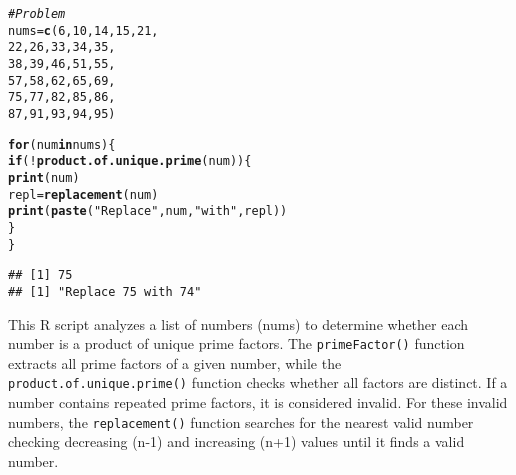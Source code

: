 \documentclass{article}\usepackage[]{graphicx}\usepackage[]{xcolor}
\makeatletter
\newcommand{\hlnum}[1]{\textcolor[rgb]{0.686,0.059,0.569}{#1}}%
\newcommand{\hlsng}[1]{\textcolor[rgb]{0.192,0.494,0.8}{#1}}%
\newcommand{\hlcom}[1]{\textcolor[rgb]{0.678,0.584,0.686}{\textit{#1}}}%
\newcommand{\hlopt}[1]{\textcolor[rgb]{0,0,0}{#1}}%
\newcommand{\hldef}[1]{\textcolor[rgb]{0.345,0.345,0.345}{#1}}%
\newcommand{\hlkwa}[1]{\textcolor[rgb]{0.161,0.373,0.58}{\textbf{#1}}}%
\newcommand{\hlkwb}[1]{\textcolor[rgb]{0.69,0.353,0.396}{#1}}%
\newcommand{\hlkwd}[1]{\textcolor[rgb]{0.737,0.353,0.396}{\textbf{#1}}}%
\newenvironment{kframe}{%
 \def\at@end@of@kframe{}%
 \ifinner\ifhmode%
  \def\at@end@of@kframe{\end{minipage}}%
  \begin{minipage}{\columnwidth}%
 \fi\fi%
 \def\FrameCommand##1{\hskip\@totalleftmargin \hskip-\fboxsep
 \colorbox{shadecolor}{##1}\hskip-\fboxsep
     \hskip-\linewidth \hskip-\@totalleftmargin \hskip\columnwidth}%
 \MakeFramed {\advance\hsize-\width
   \@totalleftmargin\z@ \linewidth\hsize
   \@setminipage}}%
 {\par\unskip\endMakeFramed%
 \at@end@of@kframe}
\newenvironment{knitrout}{}{} %
\makeatother
\begin{document}
\begin{enumerate}
\begin{knitrout}
\begin{kframe}
\begin{alltt}
\hlcom{# Problem}
\hldef{nums} \hlkwb{=} \hlkwd{c}\hldef{(}\hlnum{6}\hldef{,} \hlnum{10}\hldef{,} \hlnum{14}\hldef{,} \hlnum{15}\hldef{,} \hlnum{21}\hldef{,}
         \hlnum{22}\hldef{,} \hlnum{26}\hldef{,} \hlnum{33}\hldef{,} \hlnum{34}\hldef{,} \hlnum{35}\hldef{,}
         \hlnum{38}\hldef{,} \hlnum{39}\hldef{,} \hlnum{46}\hldef{,} \hlnum{51}\hldef{,} \hlnum{55}\hldef{,}
         \hlnum{57}\hldef{,} \hlnum{58}\hldef{,} \hlnum{62}\hldef{,} \hlnum{65}\hldef{,} \hlnum{69}\hldef{,}
         \hlnum{75}\hldef{,} \hlnum{77}\hldef{,} \hlnum{82}\hldef{,} \hlnum{85}\hldef{,} \hlnum{86}\hldef{,}
         \hlnum{87}\hldef{,} \hlnum{91}\hldef{,} \hlnum{93}\hldef{,} \hlnum{94}\hldef{,} \hlnum{95}\hldef{)}

\hlkwa{for} \hldef{(num} \hlkwa{in} \hldef{nums) \{}
  \hlkwa{if} \hldef{(}\hlopt{!}\hlkwd{product.of.unique.prime}\hldef{(num))\{}
    \hlkwd{print}\hldef{(num)}
    \hldef{repl} \hlkwb{=} \hlkwd{replacement}\hldef{(num)}
    \hlkwd{print}\hldef{(}\hlkwd{paste}\hldef{(}\hlsng{"Replace"}\hldef{, num,} \hlsng{"with"}\hldef{, repl))}
  \hldef{\}}
\hldef{\}}
\end{alltt}
\begin{verbatim}
## [1] 75
## [1] "Replace 75 with 74"
\end{verbatim}
\end{kframe}
\end{knitrout}

This R script analyzes a list of numbers (nums) to determine whether each number is a product of unique prime factors. The \texttt{primeFactor()} function extracts all prime factors of a given number, while the \texttt{product.of.unique.prime()} function checks whether all factors are distinct. If a number contains repeated prime factors, it is considered invalid. For these invalid numbers, the \texttt{replacement()} function searches for the nearest valid number checking decreasing (n-1) and increasing (n+1) values until it finds a valid number.  

\end{enumerate}


\end{document}
